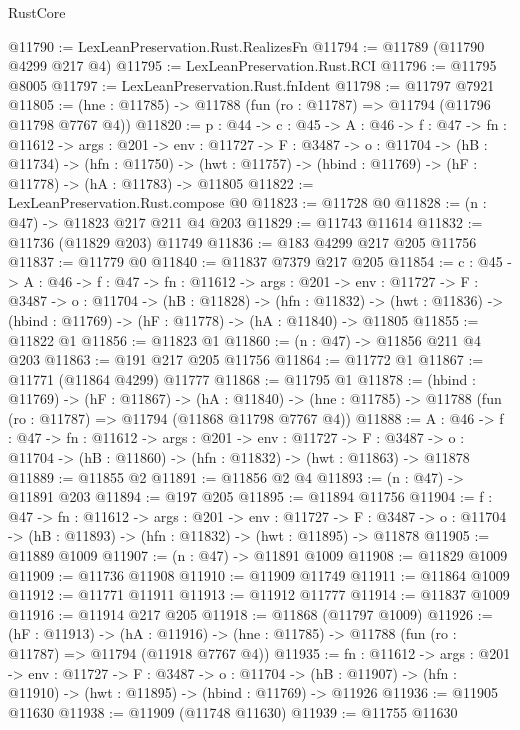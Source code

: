 \begin{lexlean}{RustCore}
\begin{coremodule}
@11790 := LexLeanPreservation.Rust.RealizesFn
@11794 := @11789 (@11790 @4299 @217 @4)
@11795 := LexLeanPreservation.Rust.RCI
@11796 := @11795 @8005
@11797 := LexLeanPreservation.Rust.fnIdent
@11798 := @11797 @7921
@11805 := (hne : @11785) -> @11788 (fun (ro : @11787) => @11794 (@11796 @11798 @7767 @4))
@11820 := {p : @44} ->
  {c : @45} ->
  {A : @46} ->
  {f : @47} ->
  {fn : @11612} ->
  {args : @201} ->
  {env : @11727} ->
  {F : @3487} ->
  {o : @11704} ->
  (hB : @11734) ->
  (hfn : @11750) -> (hwt : @11757) -> (hbind : @11769) -> (hF : @11778) -> (hA : @11783) -> @11805
@11822 := LexLeanPreservation.Rust.compose @0
@11823 := @11728 @0
@11828 := (n : @47) -> @11823 @217 @211 @4 @203
@11829 := @11743 @11614
@11832 := @11736 (@11829 @203) @11749
@11836 := @183 @4299 @217 @205 @11756
@11837 := @11779 @0
@11840 := @11837 @7379 @217 @205
@11854 := {c : @45} ->
  {A : @46} ->
  {f : @47} ->
  {fn : @11612} ->
  {args : @201} ->
  {env : @11727} ->
  {F : @3487} ->
  {o : @11704} ->
  (hB : @11828) ->
  (hfn : @11832) -> (hwt : @11836) -> (hbind : @11769) -> (hF : @11778) -> (hA : @11840) -> @11805
@11855 := @11822 @1
@11856 := @11823 @1
@11860 := (n : @47) -> @11856 @211 @4 @203
@11863 := @191 @217 @205 @11756
@11864 := @11772 @1
@11867 := @11771 (@11864 @4299) @11777
@11868 := @11795 @1
@11878 := (hbind : @11769) ->
  (hF : @11867) ->
  (hA : @11840) -> (hne : @11785) -> @11788 (fun (ro : @11787) => @11794 (@11868 @11798 @7767 @4))
@11888 := {A : @46} ->
  {f : @47} ->
  {fn : @11612} ->
  {args : @201} ->
  {env : @11727} ->
  {F : @3487} -> {o : @11704} -> (hB : @11860) -> (hfn : @11832) -> (hwt : @11863) -> @11878
@11889 := @11855 @2
@11891 := @11856 @2 @4
@11893 := (n : @47) -> @11891 @203
@11894 := @197 @205
@11895 := @11894 @11756
@11904 := {f : @47} ->
  {fn : @11612} ->
  {args : @201} ->
  {env : @11727} ->
  {F : @3487} -> {o : @11704} -> (hB : @11893) -> (hfn : @11832) -> (hwt : @11895) -> @11878
@11905 := @11889 @1009
@11907 := (n : @47) -> @11891 @1009
@11908 := @11829 @1009
@11909 := @11736 @11908
@11910 := @11909 @11749
@11911 := @11864 @1009
@11912 := @11771 @11911
@11913 := @11912 @11777
@11914 := @11837 @1009
@11916 := @11914 @217 @205
@11918 := @11868 (@11797 @1009)
@11926 := (hF : @11913) ->
  (hA : @11916) -> (hne : @11785) -> @11788 (fun (ro : @11787) => @11794 (@11918 @7767 @4))
@11935 := {fn : @11612} ->
  {args : @201} ->
  {env : @11727} ->
  {F : @3487} ->
  {o : @11704} -> (hB : @11907) -> (hfn : @11910) -> (hwt : @11895) -> (hbind : @11769) -> @11926
@11936 := @11905 @11630
@11938 := @11909 (@11748 @11630)
@11939 := @11755 @11630

\end{coremodule}
\end{lexlean}
